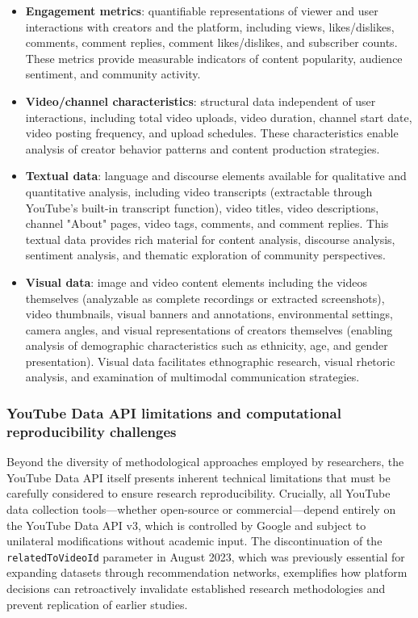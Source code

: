 \begin{itemize}
	\item \textbf{Engagement metrics}: quantifiable representations of viewer and user interactions with creators and the platform, including views, likes/dislikes, comments, comment replies, comment likes/dislikes, and subscriber counts. These metrics provide measurable indicators of content popularity, audience sentiment, and community activity.

	\item \textbf{Video/channel characteristics}: structural data independent of user interactions, including total video uploads, video duration, channel start date, video posting frequency, and upload schedules. These characteristics enable analysis of creator behavior patterns and content production strategies.

	\item \textbf{Textual data}: language and discourse elements available for qualitative and quantitative analysis, including video transcripts (extractable through YouTube's built-in transcript function), video titles, video descriptions, channel "About" pages, video tags, comments, and comment replies. This textual data provides rich material for content analysis, discourse analysis, sentiment analysis, and thematic exploration of community perspectives.

	\item \textbf{Visual data}: image and video content elements including the videos themselves (analyzable as complete recordings or extracted screenshots), video thumbnails, visual banners and annotations, environmental settings, camera angles, and visual representations of creators themselves (enabling analysis of demographic characteristics such as ethnicity, age, and gender presentation). Visual data facilitates ethnographic research, visual rhetoric analysis, and examination of multimodal communication strategies.
\end{itemize}

\subsubsection{YouTube Data API limitations and computational reproducibility challenges}

Beyond the diversity of methodological approaches employed by researchers, the YouTube Data API itself presents inherent technical limitations that must be carefully considered to ensure research reproducibility. Crucially, all YouTube data collection tools—whether open-source or commercial—depend entirely on the YouTube Data API v3, which is controlled by Google and subject to unilateral modifications without academic input. The discontinuation of the \texttt{relatedToVideoId} parameter in August 2023, which was previously essential for expanding datasets through recommendation networks, exemplifies how platform decisions can retroactively invalidate established research methodologies and prevent replication of earlier studies.


